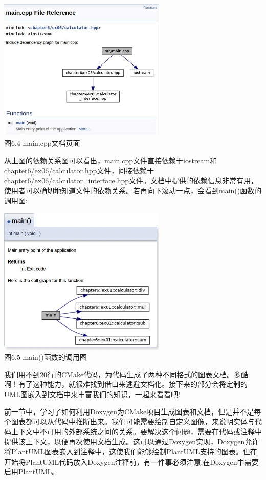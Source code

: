 \begin{center}
\includegraphics[width=0.6\textwidth]{content/2/chapter6/images/4.jpg}\\
图6.4  main.cpp文档页面
\end{center}

从上图的依赖关系图可以看出，main.cpp文件直接依赖于iostream和chapter6/ex06/calculator.hpp文件，间接依赖于chapter6/ex06/calculator\_interface.hpp文件。文档中提供的依赖信息非常有用，使用者可以确切地知道文件的依赖关系。若再向下滚动一点，会看到main()函数的调用图:

\begin{center}
\includegraphics[width=0.6\textwidth]{content/2/chapter6/images/5.jpg}\\
图6.5  main()函数的调用图
\end{center}

我们用不到20行的CMake代码，为代码生成了两种不同格式的图表文档。多酷啊！有了这种能力，就很难找到借口来逃避文档化。接下来的部分会将定制的UML图嵌入到文档中来丰富我们的知识，一起来看看吧!
 

前一节中，学习了如何利用Doxygen为CMake项目生成图表和文档，但是并不是每个图表都可以从代码中推断出来。我们可能需要绘制自定义图像，来说明实体与代码上下文中不可用的外部系统之间的关系。要解决这个问题，需要在代码或注释中提供该上下文，以便再次使用文档生成。这可以通过Doxygen实现，Doxygen允许将PlantUML图表嵌入到注释中，这使我们能够绘制PlantUML支持的图表。但在开始将PlantUML代码放入Doxygen注释前，有一件事必须注意:在Doxygen中需要启用PlantUML。

